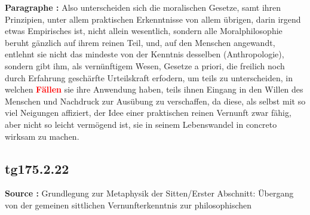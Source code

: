 \documentclass[a4paper,12pt,twoside]{book}
\newcommand{\match}[1]{\textcolor{red}{\textbf{#1}}}
\begin{document}
	\noindent\textbf{Paragraphe : }Also unterscheiden sich die moralischen Gesetze, samt ihren Prinzipien, unter allem praktischen Erkenntnisse von allem übrigen, darin irgend etwas Empirisches ist, nicht allein wesentlich, sondern alle Moralphilosophie beruht gänzlich auf ihrem reinen Teil, und, auf den Menschen angewandt, entlehnt sie nicht das mindeste von der Kenntnis desselben (Anthropologie), sondern gibt ihm, als vernünftigem Wesen, Gesetze a priori, die freilich noch durch Erfahrung geschärfte Urteilskraft erfodern, um teils zu unterscheiden,  in welchen \match{Fällen} sie ihre Anwendung haben, teils ihnen Eingang in den Willen des Menschen und Nachdruck zur Ausübung zu verschaffen, da diese, als selbst mit so viel Neigungen affiziert, der Idee einer praktischen reinen Vernunft zwar fähig, aber nicht so leicht vermögend ist, sie in seinem Lebenswandel in concreto wirksam zu machen. 
	
	\subsection*{tg175.2.22} 
	\textbf{Source : }Grundlegung zur Metaphysik der Sitten/Erster Abschnitt: Übergang von der gemeinen sittlichen Vernunfterkenntnis zur philosophischen\\  
	
\end{document}
